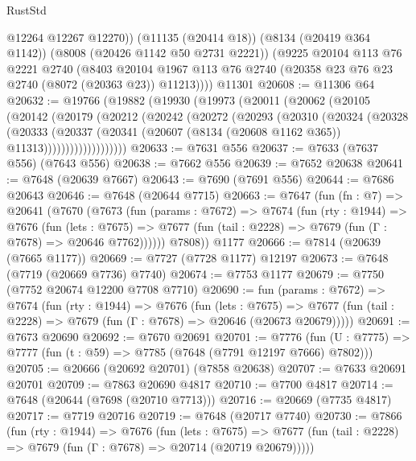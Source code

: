 \begin{lexlean}{RustStd}
\begin{coremodule}
{\begin{coremodule}
{{{{{{{{{{{{{{{{{{{{{{{{{{{{{{{{{{{{{{{{{{{{{{{{{{{{{          @12264
          @12267
          @12270))
      (@11135 (@20414 @18))
      (@8134 (@20419 @364 @1142))
      (@8008 (@20426 @1142 @50 @2731 @2221))
      (@9225
        @20104
        @113
        @76
        @2221
        @2740
        (@8403 @20104 @1967 @113 @76 @2740 (@20358 @23 @76 @23 @2740 (@8072 (@20363 @23)) @11213))))
    @11301
@20608 := @11306 @64
@20632 := @19766
    (@19882
      (@19930
        (@19973
          (@20011
            (@20062
              (@20105
                (@20142
                  (@20179
                    (@20212
                      (@20242
                        (@20272
                          (@20293
                            (@20310
                              (@20324
                                (@20328
                                  (@20333
                                    (@20337
                                      (@20341
                                        (@20607
                                          (@8134 (@20608 @1162 @365))
                                          @11313)))))))))))))))))))
@20633 := @7631 @556
@20637 := @7633 (@7637 @556) (@7643 @556)
@20638 := @7662 @556
@20639 := @7652 @20638
@20641 := @7648 (@20639 @7667)
@20643 := @7690 (@7691 @556)
@20644 := @7686 @20643
@20646 := @7648 (@20644 @7715)
@20663 := @7647
    (fun (fn : @7) =>
    @20641
      (@7670
        (@7673
          (fun (params : @7672) =>
          @7674
            (fun (rty : @1944) =>
            @7676
              (fun (lets : @7675) =>
              @7677 (fun (tail : @2228) => @7679 (fun (Γ : @7678) => @20646 @7762))))))
        @7808))
    @1177
@20666 := @7814 (@20639 (@7665 @1177))
@20669 := @7727 (@7728 @1177) @12197
@20673 := @7648 (@7719 (@20669 @7736) @7740)
@20674 := @7753 @1177
@20679 := @7750 (@7752 @20674 @12200 @7708 @7710)
@20690 := fun (params : @7672) =>
  @7674
    (fun (rty : @1944) =>
    @7676
      (fun (lets : @7675) =>
      @7677 (fun (tail : @2228) => @7679 (fun (Γ : @7678) => @20646 (@20673 @20679)))))
@20691 := @7673 @20690
@20692 := @7670 @20691
@20701 := @7776
    (fun (U : @7775) => @7777 (fun (t : @59) => @7785 (@7648 (@7791 @12197 @7666) @7802)))
@20705 := @20666 (@20692 @20701) (@7858 @20638)
@20707 := @7633 @20691 @20701
@20709 := @7863 @20690 @4817
@20710 := @7700 @4817
@20714 := @7648 (@20644 (@7698 (@20710 @7713)))
@20716 := @20669 (@7735 @4817)
@20717 := @7719 @20716
@20719 := @7648 (@20717 @7740)
@20730 := @7866
    (fun (rty : @1944) =>
    @7676
      (fun (lets : @7675) =>
      @7677 (fun (tail : @2228) => @7679 (fun (Γ : @7678) => @20714 (@20719 @20679)))))
}}}}}}}}}}}}}}}}}}}}}}}}}}}}}}}}}}}}}}}}}}}}}}}}}}}}}
\end{coremodule}}
\end{coremodule}
\end{lexlean}
